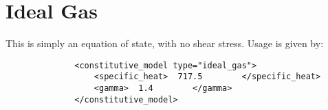 \section{Ideal Gas}  This is simply an equation of state, with no shear stress.
Usage is given by:

\begin{lstlisting}
              <constitutive_model type="ideal_gas">
                  <specific_heat>  717.5        </specific_heat>
                  <gamma>  1.4        </gamma>
              </constitutive_model>
\end{lstlisting}

